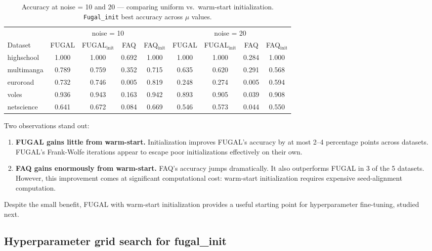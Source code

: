 \documentclass[11pt,a4paper]{article}
\begin{document}
\begin{table}[H]
  \centering
  \caption{Accuracy at noise = 10 and 20 — comparing uniform vs.\ warm-start initialization.
           \texttt{Fugal\_init} best accuracy across $\mu$ values.}
  \label{tab:init}
  \setlength{\tabcolsep}{5pt}
  \begin{tabular}{lcccccccc}
    \toprule
    & \multicolumn{4}{c}{noise = 10} & \multicolumn{4}{c}{noise = 20} \\
    \cmidrule(lr){2-5}\cmidrule(lr){6-9}
    Dataset & FUGAL & FUGAL$_{\text{init}}$ & FAQ & FAQ$_{\text{init}}$ &
              FUGAL & FUGAL$_{\text{init}}$ & FAQ & FAQ$_{\text{init}}$ \\
    \midrule
    highschool & 1.000 & 1.000 & 0.692 & 1.000 & 1.000 & 1.000 & 0.284 & 1.000 \\
    multimanga & 0.789 & 0.759 & 0.352 & 0.715 & 0.635 & 0.620 & 0.291 & 0.568 \\
    euroroad   & 0.732 & 0.746 & 0.005 & 0.819 & 0.248 & 0.274 & 0.005 & 0.594 \\
    voles      & 0.936 & 0.943 & 0.163 & 0.942 & 0.893 & 0.905 & 0.039 & 0.908 \\
    netscience & 0.641 & 0.672 & 0.084 & 0.669 & 0.546 & 0.573 & 0.044 & 0.550 \\
    \bottomrule
  \end{tabular}
\end{table}

Two observations stand out:

\begin{enumerate}
  \item \textbf{FUGAL gains little from warm-start.}  Initialization improves FUGAL's accuracy by at most 2--4 percentage points across datasets.  FUGAL's Frank-Wolfe iterations appear to escape poor initializations effectively on their own.

  \item \textbf{FAQ gains enormously from warm-start.}  FAQ's accuracy jumps dramatically. It also outperforms FUGAL in 3 of the 5 datasets. However, this improvement comes at significant computational cost: warm-start initialization requires expensive seed-alignment computation.
\end{enumerate}

Despite the small benefit, FUGAL with warm-start initialization provides a useful starting point for hyperparameter fine-tuning, studied next.

\subsection{Hyperparameter grid search for fugal\_init}
\end{document}
